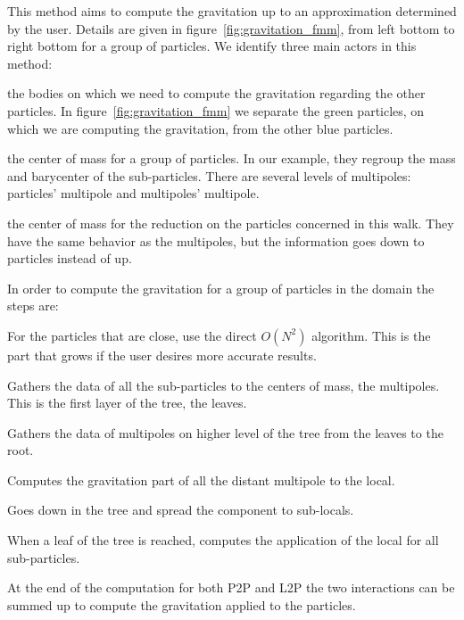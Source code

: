 This method aims to compute the gravitation up to an approximation determined by the user. 
Details are given in figure~\ref{fig:gravitation_fmm}, from left bottom to right bottom for a group of particles.
We identify three main actors in this method: \\

\begin{description}
\item[Particles: ] the bodies on which we need to compute the gravitation regarding the other particles. 
In figure~\ref{fig:gravitation_fmm} we separate the green particles, on which we are computing the gravitation, from the other blue particles. 
\item[Multipoles: ] the center of mass for a group of particles.
In our example, they regroup the mass and barycenter of the sub-particles. 
There are several levels of multipoles: particles' multipole and multipoles' multipole.
\item[Locals: ] the center of mass for the reduction on the particles concerned in this walk. 
They have the same behavior as the multipoles, but the information goes down to particles instead of up.\\ 
\end{description}

In order to compute the gravitation for a group of particles in the domain the steps are: \\

\begin{description}
	\item[Particles to Particles (P2P): ] For the particles that are close, use the direct $O(N^2)$ algorithm.  
	This is the part that grows if the user desires more accurate results. 
	\item[Particles to Multipoles (P2M): ] Gathers the data of all the sub-particles to the centers of mass, the multipoles.
	This is the first layer of the tree, the leaves. 
	\item[Multipoles to Multipoles (M2M): ] Gathers the data of multipoles on higher level of the tree from the leaves to the root. 
	\item[Multipoles to Local (M2L): ] Computes the gravitation part of all the distant multipole to the local. 
	\item[Local to Local (L2L): ] Goes down in the tree and spread the component to sub-locals.
	\item[Local to Particles (L2P): ] When a leaf of the tree is reached, computes the application of the local for all sub-particles. 
	\item[Summation: ] At the end of the computation for both P2P and L2P the two interactions can be summed up to compute the gravitation applied to the particles. \\
\end{description}

